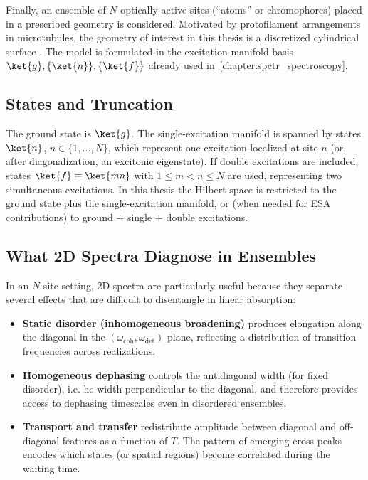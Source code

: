 Finally, an ensemble of $N$ optically active sites (``atoms'' or chromophores) placed in a prescribed geometry is considered. Motivated by protofilament arrangements in microtubules, the geometry of interest in this thesis is a discretized cylindrical surface \cite{kalraetal2023electronicenergymigration}. The model is formulated in the excitation-manifold basis \,$\ket{g},\{\ket{n}\},\{\ket{f}\}$ already used in~\autoref{chapter:spctr_spectroscopy}.

\subsection{States and Truncation}


The ground state is $\ket{g}$. The single-excitation manifold is spanned by states $\ket{n}$, $n\in\{1,\dots,N\}$, which represent one excitation localized at site $n$ (or, after diagonalization, an excitonic eigenstate). If double excitations are included, states $\ket{f}\equiv\ket{mn}$ with $1\le m<n\le N$ are used, representing two simultaneous excitations.
In this thesis the Hilbert space is restricted to the ground state plus the single-excitation manifold, or (when needed for ESA contributions) to ground + single + double excitations.

\subsection{What 2D Spectra Diagnose in Ensembles}
\label{sec:model_ensemble_interpretation}


In an $N$-site setting, 2D spectra are particularly useful because they separate several effects that are difficult to disentangle in linear absorption:
\begin{itemize}
	\item \textbf{Static disorder (inhomogeneous broadening)} produces elongation along the diagonal in the $(\omega_{\mathrm{coh}},\omega_{\mathrm{det}})$ plane, reflecting a distribution of transition frequencies across realizations.
	\item \textbf{Homogeneous dephasing} controls the antidiagonal width (for fixed disorder), i.e.	he width perpendicular to the diagonal, and therefore provides access to dephasing timescales even in disordered ensembles.
	\item \textbf{Transport and transfer} redistribute amplitude between diagonal and off-diagonal features as a function of $T$. The pattern of emerging cross peaks encodes which states (or spatial regions) become correlated during the waiting time.
\end{itemize}

